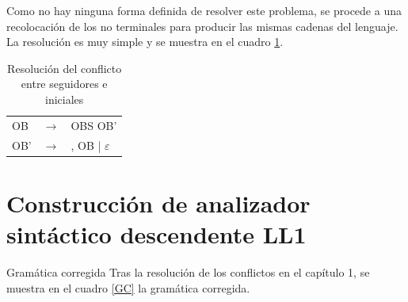 \documentclass[11pt,a4paper,spanish,twoside]{book}
\makeatletter
\renewcommand{\section}{
  \@startsection{section}{1}{0mm}{\baselineskip}
  {2.5mm}{\Large\bf}
}
\theoremstyle{plain} \newtheorem{nota}{Nota}
\makeatother
\begin{document}
Como no hay ninguna forma definida de resolver este problema, se procede a una
recolocación de los no terminales para producir las mismas cadenas del lenguaje.
La resolución es muy simple y se muestra en el cuadro \ref{seg1}.

\begin{table}[!ht]
  \centering
  \begin{tabular}{lll}
    \hline
    OB  & $\to$ & OBS OB'\\
    OB' & $\to$ & , OB | $\varepsilon$\\
    \hline
  \end{tabular}
  \caption{Resolución del conflicto entre seguidores e iniciales}\label{seg1}
\end{table}

\chapter{Construcción de analizador sintáctico descendente LL1}

\section{Gramática corregida}
Tras la resolución de los conflictos en el capítulo 1, se muestra en el cuadro
\ref{GC} la gramática corregida.
\end{document}
